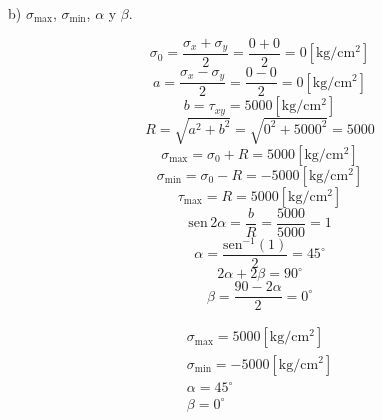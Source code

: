 \documentclass[letter,10pt,twoside]{article}
\begin{document}
b) $\sigma_{\text{max}}$, $\sigma_{\text{min}}$, $\alpha$ y $\beta$.

\begin{equation*}
    \sigma_0 = \frac{\sigma_x + \sigma_y}{2}
             = \frac{0 + 0}{2}
             = 0[\text{kg}/\text{cm}^2]
\end{equation*}
\begin{equation*}
    a = \frac{\sigma_x - \sigma_y}{2}
      = \frac{0 - 0}{2}
      = 0[\text{kg}/\text{cm}^2]
\end{equation*}
\begin{equation*}
    b = \tau_{xy}
      = 5000[\text{kg}/\text{cm}^2]
\end{equation*}
\begin{equation*}
    R = \sqrt{a^2 + b^2}
      = \sqrt{0^2 + 5000^2}
      = 5000
\end{equation*}
\begin{equation*}
    \sigma_{\text{max}} = \sigma_0 + R
                        = 5000[\text{kg}/\text{cm}^2]
\end{equation*}
\begin{equation*}
    \sigma_{\text{min}} = \sigma_0 - R
                        = -5000[\text{kg}/\text{cm}^2]
\end{equation*}
\begin{equation*}
    \tau_{\text{max}} = R
                      = 5000[\text{kg}/\text{cm}^2]
\end{equation*}
\begin{equation*}
    \text{sen}\,2\alpha = \frac{b}{R}
                        = \frac{5000}{5000}
                        = 1
\end{equation*}
\begin{equation*}
    \alpha = \frac{\text{sen}^{-1}(1)}{2}
           = 45^\circ
\end{equation*}
\begin{equation*}
    2\alpha + 2\beta = 90^\circ
\end{equation*}
\begin{equation*}
    \beta = \frac{90 - 2\alpha}{2}
          = 0^\circ
\end{equation*}

\begin{equation*}
\boxed{
    \begin{array}{l}
        \sigma_{\text{max}} = 5000[\text{kg}/\text{cm}^2] \\
        \sigma_{\text{min}} = -5000[\text{kg}/\text{cm}^2] \\
        \alpha = 45^\circ \\
        \beta = 0^\circ
    \end{array}
}
\end{equation*}
\end{document}
